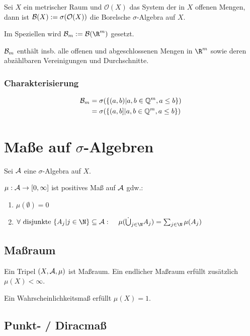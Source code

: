 Sei $X$ ein metrischer Raum und $\mathcal{O}(X)$ das System der in $X$ offenen Mengen, dann ist $\mathcal{B}(X) := \sigma(\mathcal{O}(X))$ die Borelsche $\sigma$-Algebra auf $X$.

Im Speziellen wird $\B_m := \B(\R^m)$ gesetzt.

$\mathcal{B}_m$ enthält insb. alle offenen und abgeschlossenen Mengen in $\R^m$ sowie deren abzählbaren Vereinigungen und Durchschnitte.

\subsubsection*{Charakterisierung}

\vspace*{-4mm}
\begin{align*}
	\mathcal{B}_m &= \sigma(\{(a, b) | a, b \in \mathbb{Q}^m, a \leq b\}) \\
	              &= \sigma(\{(a, b] | a, b \in \mathbb{Q}^m, a \leq b\})
\end{align*}

\section*{Maße auf $\sigma$-Algebren}

Sei $\mathcal{A}$ eine $\sigma$-Algebra auf $X$.

$\mu : \mathcal{A} \to [0, \infty]$ ist positives Maß auf $\mathcal{A}$ gdw.:

\begin{enumerate}[label=(\alph*)]
	\item $\mu(\emptyset) = 0$
	\item $\forall \text{ disjunkte } \{A_j | j \in \N\} \subseteq \A :\\ \hspace*{4mm} \mu(\dot\bigcup_{j\in \N} A_j) = \sum_{j\in \N} \mu(A_j)$
\end{enumerate}

\subsection*{Maßraum}

Ein Tripel $(X, \mathcal{A}, \mu)$ ist Maßraum. Ein endlicher Maßraum erfüllt zusätzlich $\mu(X) < \infty$.

Ein Wahrscheinlichkeitsmaß erfüllt $\mu(X) = 1$.

\subsection*{Punkt- / Diracmaß}

